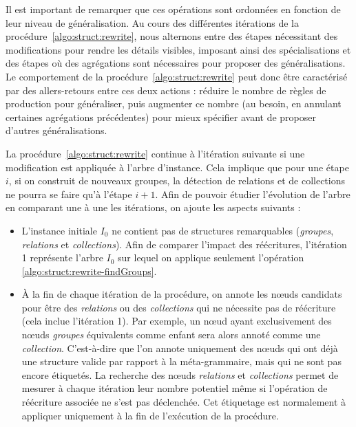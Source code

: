 Il est important de remarquer que ces opérations sont ordonnées en fonction de leur niveau de généralisation.
Au cours des différentes itérations de la procédure~\ref{algo:struct:rewrite}, nous alternons entre des étapes nécessitant des modifications pour rendre les détails visibles, imposant ainsi des spécialisations et des étapes où des agrégations sont nécessaires pour proposer des généralisations.
Le comportement de la procédure~\ref{algo:struct:rewrite} peut donc être caractérisé par des allers-retours entre ces deux actions : réduire le nombre de règles de production pour généraliser, puis augmenter ce nombre (au besoin, en annulant certaines agrégations précédentes) pour mieux spécifier avant de proposer d'autres généralisations.

La procédure~\ref{algo:struct:rewrite} continue à l'itération suivante si une modification est appliquée à l'arbre d'instance.
Cela implique que pour une étape $i$, si on construit de nouveaux groupes, la détection de relations et de collections ne pourra se faire qu'à l'étape $i + 1$.
Afin de pouvoir étudier l'évolution de l'arbre en comparant une à une les itérations, on ajoute les aspects suivants :
\begin{itemize}
    \item L'instance initiale $I_0$ ne contient pas de structures remarquables (\emph{groupes}, \emph{relations} et \emph{collections}).
    Afin de comparer l'impact des réécritures, l'itération \num{1} représente l'arbre $I_0$ sur lequel on applique seulement l'opération \ref{algo:struct:rewrite-findGroups}.

    \item À la fin de chaque itération de la procédure, on annote les nœuds candidats pour être des \emph{relations} ou des \emph{collections} qui ne nécessite pas de réécriture (cela inclue l'itération \num{1}).
    Par exemple, un nœud ayant exclusivement des nœuds \emph{groupes} équivalents comme enfant sera alors annoté comme une \emph{collection}.
    C'est-à-dire que l'on annote uniquement des nœuds qui ont déjà une structure valide par rapport à la méta-grammaire, mais qui ne sont pas encore étiquetés.
    La recherche des nœuds \emph{relations} et \emph{collections} permet de mesurer à chaque itération leur nombre potentiel même si l'opération de réécriture associée ne s'est pas déclenchée.
    Cet étiquetage est normalement à appliquer uniquement à la fin de l'exécution de la procédure.
\end{itemize}

